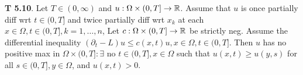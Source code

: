 {\bf T 5.10}. Let $T \in (0,\infty)$ and $u: \Omega \times (0,T] \rightarrow \mathbb{R}$. Assume that $u$ is once partially diff wrt $t \in (0,T]$ and twice partially diff wrt $x_k$ at each $x \in \Omega, t \in (0,T], k = 1, \dots, n$, Let $c: \Omega \times (0, T] \rightarrow \mathbb{R}$ be strictly neg. Assume the differential inequality $(\partial_t - L)u \leq c(x,t)u, x \in \Omega, t \in (0,T]$. Then $u$ has no positive max in $\Omega \times (0,T]: \exists$ no $t\in (0,T], x \in \Omega$ such that $u(x,t) \geq u(y,s)$ for all $s \in (0,T], y \in \Omega$, and $u(x,t) > 0$.

